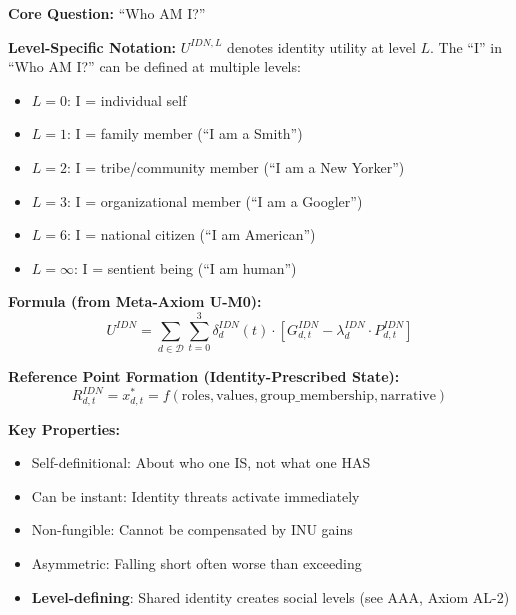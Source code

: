 \begin{tcolorbox}[colback=orange!5!white, colframe=orange!75!black, 
    title=Identity Utility (IDN)]

\textbf{Core Question:} ``Who AM I?''

\textbf{Level-Specific Notation:} $U^{IDN,L}$ denotes identity utility at level $L$.
The ``I'' in ``Who AM I?'' can be defined at multiple levels:
\begin{itemize}[nosep]
\item $L = 0$: I = individual self
\item $L = 1$: I = family member (``I am a Smith'')
\item $L = 2$: I = tribe/community member (``I am a New Yorker'')
\item $L = 3$: I = organizational member (``I am a Googler'')
\item $L = 6$: I = national citizen (``I am American'')
\item $L = \infty$: I = sentient being (``I am human'')
\end{itemize}

\textbf{Formula (from Meta-Axiom U-M0):}
\begin{equation}
U^{IDN} = \sum_{d \in \mathcal{D}} \sum_{t=0}^{3} \delta^{IDN}_{d}(t) \cdot 
\left[ G^{IDN}_{d,t} - \lambda^{IDN}_{d} \cdot P^{IDN}_{d,t} \right]
\end{equation}

\textbf{Reference Point Formation (Identity-Prescribed State):}
\begin{equation}
R^{IDN}_{d,t} = x^{*}_{d,t} = f(\text{roles}, \text{values}, \text{group\_membership}, \text{narrative})
\end{equation}

\textbf{Key Properties:}
\begin{itemize}
\item Self-definitional: About who one IS, not what one HAS
\item Can be instant: Identity threats activate immediately
\item Non-fungible: Cannot be compensated by INU gains
\item Asymmetric: Falling short often worse than exceeding
\item \textbf{Level-defining}: Shared identity creates social levels (see AAA, Axiom AL-2)
\end{itemize}

\end{tcolorbox}

